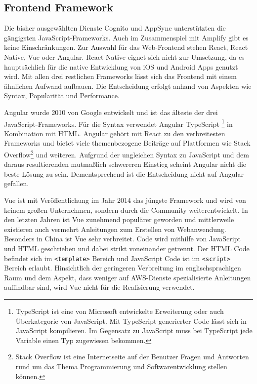 {\subsection{Frontend Framework}
\label{FrontendFramework}
Die bisher ausgewählten Dienste Cognito und AppSync unterstützten die gängigsten JavaScript-Frameworks.
Auch im Zusammenspiel mit Amplify gibt es keine Einschränkungen.
Zur Auswahl für das Web-Frontend stehen React, React Native, Vue oder Angular.
React Native eignet sich nicht zur Umsetzung, da es hauptsächlich für die native Entwicklung von iOS und Android Apps genutzt wird.
Mit allen drei restlichen Frameworks lässt sich das Frontend mit einem ähnlichen Aufwand aufbauen.
Die Entscheidung erfolgt anhand von Aspekten wie Syntax, Popularität und Performance.

Angular wurde 2010 von Google entwickelt und ist das älteste der drei JavaScript-Frameworks.
Für die Syntax verwendet Angular TypeScript
\footnote{TypeScript ist eine von Microsoft entwickelte Erweiterung oder auch Überkategorie von JavaScript.
Mit TypeScript generierter Code lässt sich in JavaScript kompilieren. Im Gegensatz zu JavaScript muss bei TypeScript jede Variable einen Typ zugewiesen bekommen.
 } in Kombination mit HTML.
 Angular gehört mit React zu den verbreitesten Frameworks und bietet viele themenbezogene Beiträge auf Plattformen wie Stack Overflow\footnote{Stack Overflow ist eine Internetseite auf der Benutzer Fragen und Antworten rund um das Thema Programmierung und Softwarentwicklung stellen können. } und weiteren.
 Aufgrund der ungleichen Syntax zu JavaScript und dem daraus resultierenden mutmaßlich schwereren Einstieg scheint Angular nicht die beste Lösung zu sein.
 Dementsprechend ist die Entscheidung nicht auf Angular gefallen.

Vue ist mit Veröffentlichung im Jahr 2014 das jüngste Framework und wird von keinem großen Unternehmen, sondern durch die Community weiterentwickelt.
In den letzten Jahren ist Vue zunehmend populärer geworden und mittlerweile existieren auch vermehrt Anleitungen zum Erstellen von Webanwendung.
Besonders in China ist Vue sehr verbreitet.\cite[Abschnitt: Comparing Adoption \& Popularity]{JavascriptFrameworks}
Code wird mithilfe von JavaScript und HTML geschrieben und dabei strikt voneinander getrennt.
Der HTML Code befindet sich im \verb+<template>+ Bereich und JavaScript Code ist im \verb+<script>+ Bereich erlaubt.
Hinsichtlich der geringeren Verbreitung im englischsprachigen Raum und dem Aspekt, dass weniger auf AWS-Dienste spezialisierte Anleitungen auffindbar sind, wird Vue nicht für die Realisierung verwendet.

}

